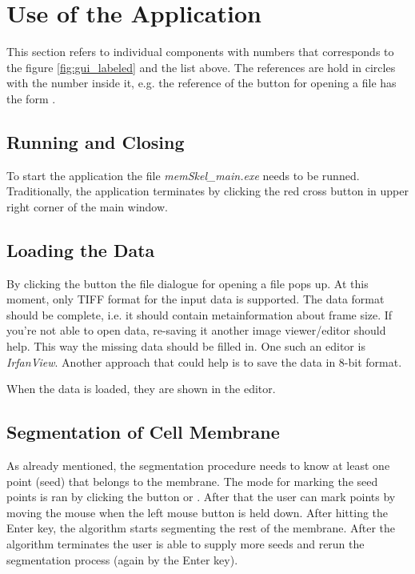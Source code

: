 \section{Use of the Application}
This section refers to individual components with numbers that corresponds to the figure \ref{fig:gui_labeled} and the list above. The references are hold in circles with the number inside it, e.g. the reference of the button for opening a file has the form .

\subsection{Running and Closing}
To start the application the file \textit{memSkel\_main.exe } needs to be runned. Traditionally, the application terminates by clicking the red cross button in upper right corner of the main window.

\subsection{Loading the Data}
By clicking the button  the file dialogue for opening a file pops up. At this moment, only TIFF format for the input data is supported. The data format should be complete, i.e. it should contain metainformation about frame size. If you're not able to open data, re-saving it another image viewer/editor  should help. This way the missing data should be filled in. One such an editor is \textit{IrfanView}. Another approach that could help is to save the data in 8-bit format.

When the data is loaded, they are shown in the editor.

\subsection{Segmentation of Cell Membrane}
As already mentioned, the segmentation procedure needs to know at least one point (seed) that belongs to the membrane. The mode for marking the seed points is ran by clicking the button  or . After that the user can mark points by moving the mouse when the left mouse button is held down. After hitting the Enter key, the algorithm starts segmenting the rest of the membrane. After the algorithm terminates the user is able to supply more seeds and rerun the segmentation process (again by the Enter key).

